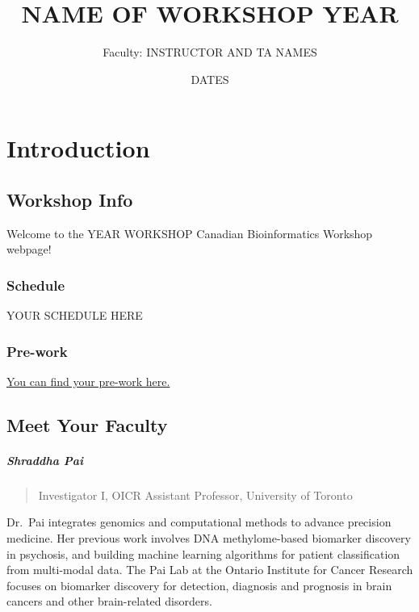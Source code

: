 \documentclass[
]{book}
\title{NAME OF WORKSHOP YEAR}
\author{Faculty: INSTRUCTOR AND TA NAMES}
\date{DATES}
\begin{document}
\maketitle

{
\setcounter{tocdepth}{1}
\tableofcontents
}
\part{Introduction}\label{part-introduction}

\chapter{Workshop Info}\label{workshop-info}

Welcome to the YEAR WORKSHOP Canadian Bioinformatics Workshop webpage!

\section{Schedule}\label{schedule}

YOUR SCHEDULE HERE

\section{Pre-work}\label{pre-work}

\href{LINK\%20TO\%20PREWORK}{You can find your pre-work here.}

\chapter{Meet Your Faculty}\label{meet-your-faculty}

\subsubsection{Shraddha Pai}\label{shraddha-pai}

\begin{quote}
Investigator I, OICR
Assistant Professor, University of Toronto
\end{quote}

Dr.~Pai integrates genomics and computational methods to advance precision
medicine. Her previous work involves DNA methylome-based biomarker discovery in psychosis, and building machine learning algorithms for patient classification from multi-modal data. The Pai Lab at the Ontario Institute for Cancer Research focuses on biomarker discovery for detection, diagnosis and prognosis in brain cancers and other brain-related disorders.
\end{document}
